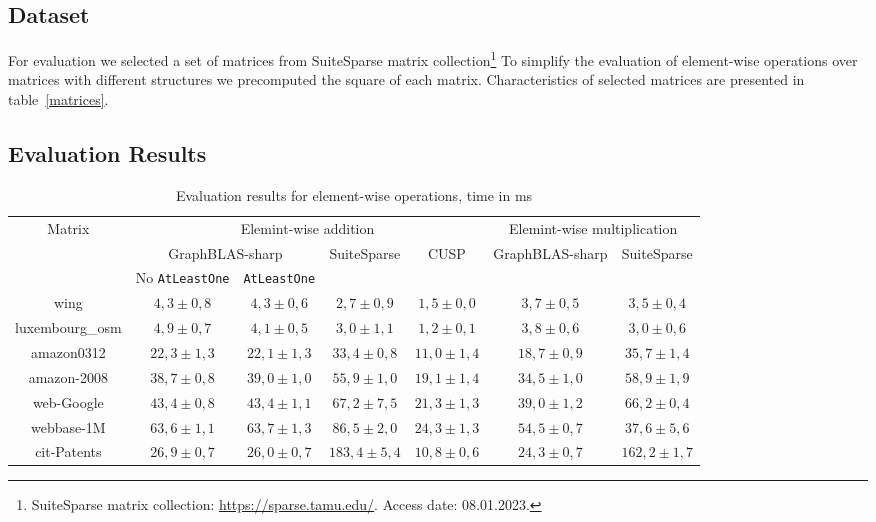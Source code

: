 \subsection {Dataset}

For evaluation we selected a set of matrices from SuiteSparse matrix collection\footnote{SuiteSparse matrix collection: \url{https://sparse.tamu.edu/}. Access date: 08.01.2023.}
To simplify the evaluation of element-wise operations over matrices with different structures we precomputed the square of each matrix.
Characteristics of selected matrices are presented in table~\ref{matrices}.

\subsection{Evaluation Results}

\begin{table*}[h]
    \centering    
    \caption{Evaluation results for element-wise operations, time in ms}    
    \label{perf-comparison}
    \begin{tabular}{|c||c|c|c|c||c|c|}
    \hline
    \multirow{3}{*}{Matrix} & \multicolumn{4}{c||}{Elemint-wise addition} & \multicolumn{2}{c|}{Elemint-wise multiplication}\\    
    \cline{2-7}        
    & \multicolumn{2}{c|}{GraphBLAS-sharp} & \multirow{2}{*}{SuiteSparse} & \multirow{2}{*}{CUSP} & \multirow{2}{*}{GraphBLAS-sharp} & \multirow{2}{*}{SuiteSparse}        \\
    &No \texttt{AtLeastOne}&\texttt{AtLeastOne}& & & &\\ 
    \hline
    \hline
    wing            & $4,3 \pm 0,8$       & $4,3 \pm 0,6$      & $2,7\pm 0,9$   & $1,5\pm 0,0$   & $3,7 \pm 0,5$      & $3,5\pm 0,4$\\
    \hline
    luxembourg\_osm & $4,9 \pm 0,7$       & $4,1 \pm 0,5$      & $3,0\pm 1,1$   & $1,2\pm 0,1$  & $3,8 \pm 0,6$      & $3,0\pm 0,6$ \\
    \hline
    amazon0312      & $22,3 \pm 1,3$       & $22,1 \pm 1,3$      & $33,4\pm 0,8$  & $11,0\pm 1,4$  & $18,7 \pm 0,9$      & $35,7\pm 1,4$ \\
    \hline
    amazon-2008     & $38,7 \pm 0,8$       & $39,0 \pm 1,0$     & $55,9\pm 1,0$  & $19,1\pm 1,4$ & $34,5 \pm 1,0$     & $58,9\pm 1,9$  \\
    \hline
    web-Google      & $43,4 \pm 0,8$       & $43,4 \pm 1,1$     & $67,2\pm 7,5$  & $21,3\pm 1,3$  & $39,0 \pm 1,2$     & $66,2\pm 0,4$ \\
    \hline
    webbase-1M      & $63,6 \pm 1,1$      & $63,7 \pm 1,3$      & $86,5\pm 2,0$  & $24,3\pm 1,3$  & $54,5 \pm 0,7$      & $37,6\pm 5,6$ \\
    \hline
    cit-Patents     & $26,9 \pm 0,7$      & $26,0 \pm 0,7$      & $183,4\pm 5,4$ & $10,8\pm 0,6$   & $24,3 \pm 0,7$      & $162,2\pm 1,7$ \\     
    \hline
    \end{tabular}    
\end{table*}

